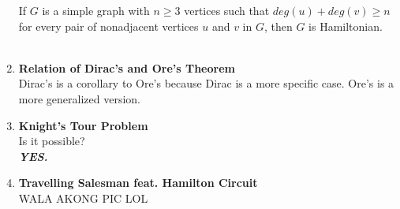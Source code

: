 \documentclass{article}
\begin{document}
\begin{enumerate}
    If $G$ is a simple graph with $n\ge3$ vertices such that $deg(u)+deg(v)\ge n$ for every pair of nonadjacent vertices $u$ and $v$ in $G$, then $G$ is Hamiltonian. \\
    \\
    \item \textbf{Relation of Dirac's and Ore's Theorem} \\
    Dirac's is a corollary to Ore's because Dirac is a more specific case. Ore's is a more generalized version. \\
    \item \textbf{Knight's Tour Problem} \\
    Is it possible? \\
    \textit{\textbf{YES.}}
    \\
    \item \textbf{Travelling Salesman feat. Hamilton Circuit} \\
    WALA AKONG PIC LOL
\end{enumerate}
\end{document}

